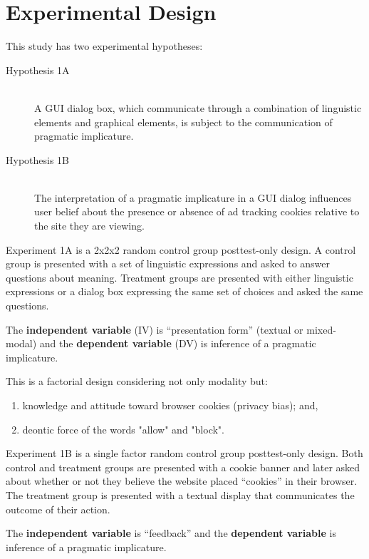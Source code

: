 \section{Experimental Design}
\label{experimentaldesign}

This study has two experimental hypotheses:

\begin{description}
\item[Hypothesis 1A] \hfill \\ 
A GUI dialog box, which communicate through a combination of linguistic elements and graphical elements, is subject to the communication of pragmatic implicature.
\item[Hypothesis 1B] \hfill \\ 
The interpretation of a pragmatic implicature in a GUI dialog influences user belief about the presence or absence of ad tracking cookies relative to the site they are viewing.
\end{description}

Experiment 1A is a 2x2x2 random control group posttest-only design. A control group is presented with a set of linguistic expressions and asked to answer questions about meaning. Treatment groups are presented with either linguistic expressions or a dialog box expressing the same set of choices and asked the same questions.

The \textbf{independent variable} (IV) is ``presentation form'' (textual or mixed-modal) and the \textbf{dependent variable} (DV) is inference of a pragmatic implicature. 

This is a factorial design considering not only modality but:

\begin{enumerate}
\item knowledge and attitude toward browser cookies (privacy bias); and,
\item deontic force of the words "allow" and "block".
\end{enumerate}

Experiment 1B is a single factor random control group posttest-only design. Both control and treatment groups are presented with a cookie banner and later asked about whether or not they believe the website placed ``cookies'' in their browser. The treatment group is presented with a textual display that communicates the outcome of their action.

The \textbf{independent variable} is ``feedback'' and the \textbf{dependent variable} is inference of a pragmatic implicature. 

